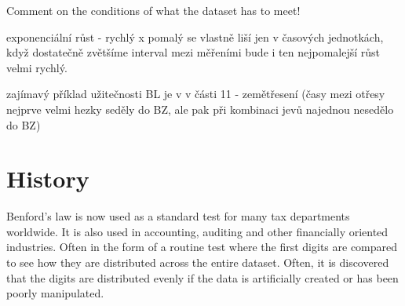 \begin{koment}
Comment on the conditions of what the dataset has to meet! 
\end{koment}







\begin{koment}
    exponenciální růst - rychlý x pomalý se vlastně liší jen v časových jednotkách, když dostatečně zvětšíme interval mezi měřeními bude i ten nejpomalejší růst velmi rychlý. \cite{kossovsky2014benford}
\end{koment} %




\begin{koment}
zajímavý příklad užitečnosti BL je v \cite{kossovsky2014benford} v části 11 - zemětřesení (časy mezi otřesy nejprve velmi hezky seděly do BZ, ale pak při kombinaci jevů najednou nesedělo do BZ)
\end{koment}


\section{History}

Benford's law is  now used as a standard test for many tax departments worldwide. It is also used in accounting, auditing and other financially oriented industries. Often in the form of a routine test where the first digits are compared to see how they are distributed across the entire dataset. Often, it is discovered that the digits are distributed evenly if the data is artificially created or has been poorly manipulated. \cite{kossovsky2014benford} %

